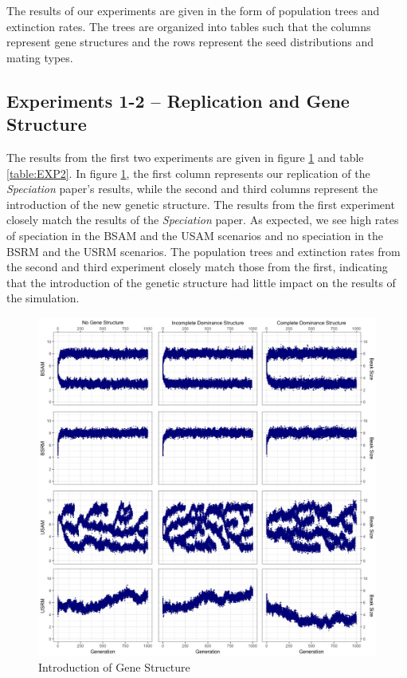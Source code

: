 \documentclass{article}
\begin{document}
The results of our experiments are given in the form of population trees and extinction rates. The trees are organized into tables such that the columns represent gene structures and the rows represent the seed distributions and mating types.

\subsection{Experiments 1-2 -- Replication and Gene Structure}

The results from the first two experiments are given in figure \ref{fig:EXP2} and table \ref{table:EXP2}. In figure \ref{fig:EXP2}, the first column represents our replication of the \textit{Speciation} paper's results, while the second and third columns represent the introduction of the new genetic structure. The results from the first experiment closely match the results of the \textit{Speciation} paper. As expected, we see high rates of speciation in the BSAM and the USAM scenarios and no speciation in the BSRM and the USRM scenarios. The population trees and extinction rates from the second and third experiment closely match those from the first, indicating that the introduction of the genetic structure had little impact on the results of the simulation.

\begin{figure} [h!]
    \centering
    \includegraphics[width=\linewidth]{Data/EXP2}
    \caption{Introduction of Gene Structure}
    \label{fig:EXP2}
\end{figure}
\end{document}
